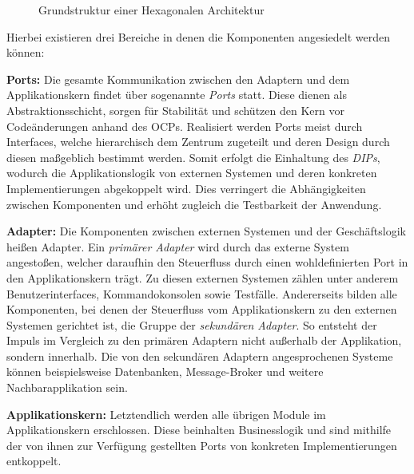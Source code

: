 \begin{figure}[H]
	\centering
	
	\caption{Grundstruktur einer Hexagonalen Architektur \cite[angelehnt an][]{hgraca.2017}}
	\label{fig:HexagonaleArchitektur}
\end{figure}

\vspace{0.3cm}

Hierbei existieren drei Bereiche in denen die Komponenten angesiedelt werden können: \cite{Cockburn.Hexagonal, Griffin.2021b}  

\textbf{Ports:} Die gesamte Kommunikation zwischen den Adaptern und dem Applikationskern findet über sogenannte \emph{Ports} statt. Diese dienen als Abstraktionsschicht, sorgen für Stabilität und schützen den Kern vor Codeänderungen anhand des \acrlong{OCP}s. Realisiert werden Ports meist durch Interfaces, welche hierarchisch dem Zentrum zugeteilt und deren Design durch diesen maßgeblich bestimmt werden. Somit erfolgt die Einhaltung des \emph{\acrlong{DIP}s}, wodurch die Applikationslogik von externen Systemen und deren konkreten Implementierungen abgekoppelt wird. Dies verringert die Abhängigkeiten zwischen Komponenten und erhöht zugleich die Testbarkeit der Anwendung. \cite{philipbrown.2014}

\pagebreak

\textbf{Adapter:} Die Komponenten zwischen externen Systemen und der Geschäftslogik heißen Adapter. Ein \emph{primärer Adapter} wird durch das externe System angestoßen, welcher daraufhin den Steuerfluss durch einen wohldefinierten Port in den Applikationskern trägt. Zu diesen externen Systemen zählen unter anderem Benutzerinterfaces, Kommandokonsolen sowie Testfälle. Andererseits bilden alle Komponenten, bei denen der Steuerfluss vom Applikationskern zu den externen Systemen gerichtet ist, die Gruppe der \emph{sekundären Adapter}. So entsteht der Impuls im Vergleich zu den primären Adaptern nicht außerhalb der Applikation, sondern innerhalb. Die von den sekundären Adaptern angesprochenen Systeme können beispielsweise Datenbanken, Message-Broker und weitere Nachbarapplikation sein.  \cite{hgraca.2017}

\textbf{Applikationskern:} Letztendlich werden alle übrigen Module im Applikationskern erschlossen. Diese beinhalten Businesslogik und sind mithilfe der von ihnen zur Verfügung gestellten Ports von konkreten Implementierungen entkoppelt. \\

